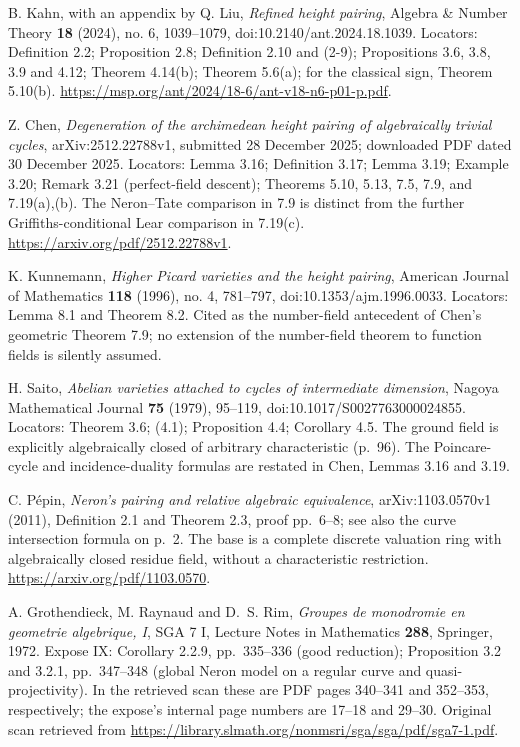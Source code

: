 B. Kahn, with an appendix by Q. Liu,
\emph{Refined height pairing}, Algebra \& Number Theory \textbf{18}
(2024), no. 6, 1039--1079,
doi:10.2140/ant.2024.18.1039.
Locators: Definition 2.2; Proposition 2.8; Definition 2.10 and (2-9);
Propositions 3.6, 3.8, 3.9 and 4.12; Theorem 4.14(b);
Theorem 5.6(a); for the classical sign,
Theorem 5.10(b).
\url{https://msp.org/ant/2024/18-6/ant-v18-n6-p01-p.pdf}.

Z. Chen, \emph{Degeneration of the archimedean height pairing of
algebraically trivial cycles}, arXiv:2512.22788v1,
submitted 28 December 2025; downloaded PDF dated 30 December 2025.
Locators: Lemma 3.16; Definition 3.17; Lemma 3.19; Example 3.20;
Remark 3.21 (perfect-field descent);
Theorems 5.10, 5.13, 7.5, 7.9, and 7.19(a),(b).
The Neron--Tate comparison in 7.9 is distinct from the further
Griffiths-conditional Lear comparison in 7.19(c).
\url{https://arxiv.org/pdf/2512.22788v1}.

K. Kunnemann, \emph{Higher Picard varieties and the height pairing},
American Journal of Mathematics \textbf{118} (1996), no. 4,
781--797, doi:10.1353/ajm.1996.0033.  Locators: Lemma 8.1 and
Theorem 8.2.  Cited as the number-field antecedent of Chen's
geometric Theorem 7.9; no extension of the number-field theorem
to function fields is silently assumed.

H. Saito, \emph{Abelian varieties attached to cycles of intermediate
dimension}, Nagoya Mathematical Journal \textbf{75} (1979),
95--119, doi:10.1017/S0027763000024855.
Locators: Theorem 3.6; (4.1); Proposition 4.4; Corollary 4.5.
The ground field is explicitly algebraically closed of arbitrary
characteristic (p.~96).  The Poincare-cycle and incidence-duality
formulas are restated in Chen, Lemmas 3.16 and 3.19.

C. P\'epin, \emph{Neron's pairing and relative algebraic equivalence},
arXiv:1103.0570v1 (2011), Definition 2.1 and Theorem 2.3,
proof pp.~6--8; see also the curve intersection formula on p.~2.
The base is a complete discrete valuation ring with algebraically
closed residue field, without a characteristic restriction.
\url{https://arxiv.org/pdf/1103.0570}.

A. Grothendieck, M. Raynaud and D.~S. Rim,
\emph{Groupes de monodromie en geometrie algebrique, I},
SGA 7 I, Lecture Notes in Mathematics \textbf{288}, Springer, 1972.
Expose IX: Corollary 2.2.9, pp.~335--336 (good reduction);
Proposition 3.2 and 3.2.1, pp.~347--348 (global Neron model on a
regular curve and quasi-projectivity).  In the retrieved scan these
are PDF pages 340--341 and 352--353, respectively; the expose's
internal page numbers are 17--18 and 29--30.
Original scan retrieved from
\url{https://library.slmath.org/nonmsri/sga/sga/pdf/sga7-1.pdf}.

